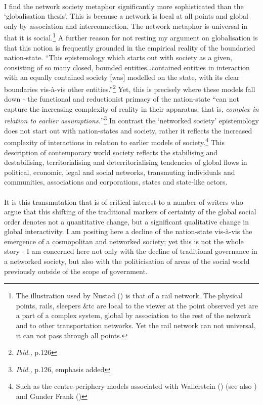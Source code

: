 \paragraph{}I find the network society metaphor significantly more sophisticated than the `globalisation thesis'. This is because a network is local at all points and global only by association and interconnection. The network metaphor is universal in that it is social.\footnote{The illustration used by Nustad (\citeyear[p.127]{Nustad:2003}) is that of a rail network. The physical points, rails, sleepers \&tc are local to the viewer at the point observed yet are a part of a complex system, global by association to the rest of the network and to other transportation networks. Yet the rail network can not universal, it can not pass through all points.} A further reason for not resting my argument on globalisation is that this notion is frequently grounded in the empirical reality of the boundaried nation-state. ``This epistemology which starts out with society as a given, consisting of so many closed, bounded entities\ldots contained entities in interaction with an equally contained society [was] modelled on the state, with its clear boundaries vis-\`{a}-vis other entities.''\footnote{\textit{Ibid.,} p.126} Yet, this is precisely where these models fall down - the functional and reductionist primacy of the nation-state ``can not capture the increasing complexity of reality in their apparatus; that is, \emph{complex in relation to earlier assumptions.}''\footnote{\textit{Ibid.,} p.126, emphasis added} In contrast the `networked society' epistemology does not start out with nation-states and society, rather it reflects the increased complexity of interactions in relation to earlier models of society.\footnote{Such as the centre-periphery models associated with Wallerstein (\citeyear{Wallerstein:1979cw}) (see also \cite{worsley:1990ow}) and Gunder Frank (\citeyear{Frank:1975du})} This description of contemporary world society reflects the stabilising and destabilising, territorialising and deterritorialising tendencies of global flows in political, economic, legal and social networks, transmuting individuals and communities, associations and corporations, states and state-like actors.

\paragraph{}It is this transmutation that is of critical interest to a number of writers who argue that this shifting of the traditional markers of certainty of the global social order denotes not a quantitative change, but a significant qualitative change in global interactivity. I am positing here a decline of the nation-state vis-\`{a}-vis the emergence of a cosmopolitan and networked society; yet this is not the whole story - I am concerned here not only with the decline of traditional  governance in a networked society, but also with the politicisation of areas of the social world previously outside of the scope of government.

